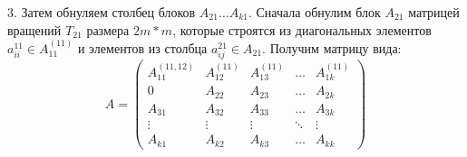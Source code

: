 \documentclass[a4paper, fontsize=14pt]{article}
\begin{document}
		3. Затем обнуляем столбец блоков $A_{21}\dots A_{k1}$. Сначала обнулим блок $A_{21}$ матрицей вращений $T_{21}$ размера $2m * m$, которые строятся из диагональных элементов $a_{ii}^{11} \in  A_{11}^{(11)}$ и элементов из столбца $a_{ij}^{21} \in A_{21}$. Получим матрицу вида:
		\begin{equation*}
			A = \left(
				\begin{array}{ccccc}
					A_{11}^{(11, 12)} & A_{12}^{(11)} & A_{13}^{(11)} & \ldots & A_{1k}^{(11)}\\
					0				  & A_{22} 		  & A_{23} 	      & \ldots & A_{2k}\\
					A_{31} 		 	  & A_{32}		  & A_{33} 		  & \ldots & A_{3k}\\
					\vdots 		  	  & \vdots 		  & \vdots		  & \ddots & \vdots\\
					A_{k1} 		  	  & A_{k2}		  & A_{k3}		  & \ldots & A_{kk}
				\end{array}
			\right)
		\end{equation*}
		
\end{document}
